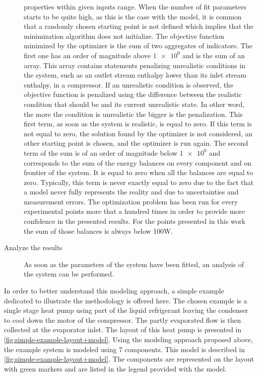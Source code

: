 \begin{description}
  properties within given inputs range. When the number of fit
  parameters starts to be quite high, as this is the case with the
  \AWP{} model, it is common that a randomly chosen starting point is
  not defined which implies that the minimization algorithm does not
  initialize. The objective function minimized by the optimizer is the
  sum of two aggregates of indicators. The first one has an order of
  magnitude above $\num{1e0}$ and is the sum of an array. This array
  contains statements penalizing unrealistic conditions in the system,
  such as an outlet stream enthalpy lower than its inlet stream
  enthalpy, in a compressor. If an unrealistic condition is observed,
  the objective function is penalized using the difference between the
  realistic condition that should be and its current unrealistic
  state. In other word, the more the condition is unrealistic the
  bigger is the penalization. This first term, as soon as the system
  is realistic, is equal to zero. If this term is not equal to zero,
  the solution found by the optimizer is not considered, an other
  starting point is chosen, and the optimizer is run again. The second
  term of the sum is of an order of magnitude below $\num{1e0}$ and
  corresponds to the sum of the energy balances on every component and
  on frontier of the system. It is equal to zero when all the balances
  are equal to zero. Typically, this term is never exactly equal to
  zero due to the fact that a model never fully represents the reality
  and due to uncertainties and measurement errors. The optimization
  problem has been run for every experimental points more that a
  hundred times in order to provide more confidence in the presented
  results. For the points presented in this work the sum of those
  balances is always below 100W.
\item[Analyze the results] As soon as the parameters of the system
  have been fitted, an analysis of the system can be performed.
\end{description}

In order to better understand this modeling approach, a simple example
dedicated to illustrate the methodology is offered here. The chosen
example is a single stage heat pump using part of the liquid
refrigerant leaving the condenser to cool down the motor of the
compressor. The partly evaporated flow is then collected at the
evaporator inlet. The layout of this heat pump is presented in
\cref{fig:simple-example-layout+model}. Using the modeling approach
proposed above, the example system is modeled using 7 components. This
model is described in \cref{fig:simple-example-layout+model}. The
components are represented on the layout with green markers and are
listed in the legend provided with the model.

